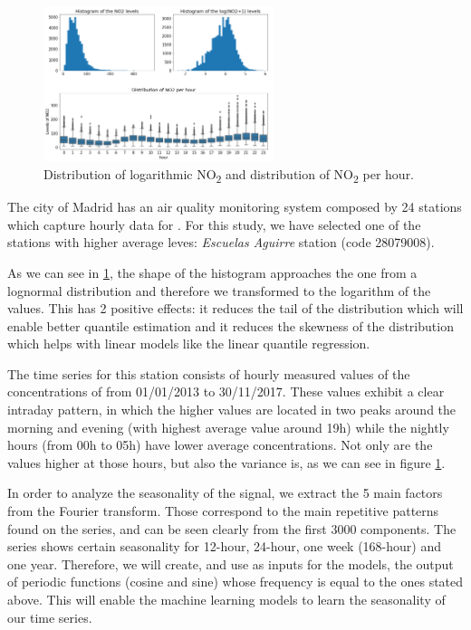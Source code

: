 \documentclass[a4paper,3p,sort&compress]{elsarticle}
\begin{document}
\begin{figure}
  \centering
  \includegraphics[width=0.6\textwidth]{histo_variance}
  \caption{\label{figure:histo_variance}Distribution of logarithmic
    NO\textsubscript{2} and distribution of NO\textsubscript{2}
    per hour.}
\end{figure}

The city of Madrid has an air quality monitoring system composed by 24
stations which capture hourly data for \no.  For this study, we have
selected one of the stations with higher average leves: \emph{Escuelas
Aguirre} station (code 28079008).

As we can see in \ref{figure:histo_variance}, the shape of the histogram
approaches the one from a lognormal distribution and therefore we
transformed to the logarithm of the values. This has 2 positive
effects: it reduces the tail of the distribution which will enable
better quantile estimation and it reduces the skewness of the
distribution which helps with linear models like the linear quantile
regression.

The time series for this station consists of hourly measured values of
the concentrations of \no from 01/01/2013 to
30/11/2017. These values exhibit a clear intraday pattern, in which
the higher values are located in two peaks around the morning and
evening (with highest average value around 19h) while the nightly
hours (from 00h to 05h) have lower average concentrations.  Not only
are the values higher at those hours, but also the variance is, as we
can see in figure \ref{figure:histo_variance}.
 
In order to analyze the seasonality of the signal, we extract the 5
main factors from the Fourier transform. Those correspond to the main
repetitive patterns found on the series, and can be seen clearly from
the first 3000 components. The series shows certain seasonality for
12-hour, 24-hour, one week (168-hour) and one year.  Therefore, we will
create, and use as inputs for the models, the output of periodic
functions (cosine and sine) whose frequency is equal to the ones
stated above. This will enable the machine learning models to learn
the seasonality of our time series.
\end{document}
